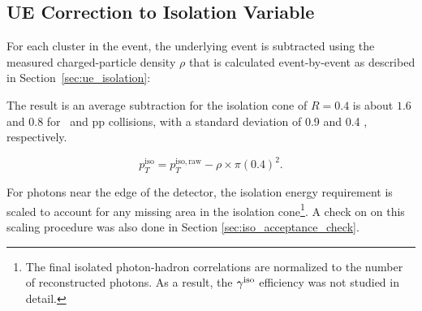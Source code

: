 
\subsection{UE Correction to Isolation Variable}
\label{sec:ue_correction_isolation}
For each cluster in the event, the underlying event is subtracted using the measured charged-particle density $\rho$ that is calculated event-by-event as described in Section~\ref{sec:ue_isolation}:


The result is an average subtraction for the isolation cone of {$R=0.4$} is about {$1.6$ \GeVc} and {$0.8$ \GeVc} for \pPb~and pp collisions, with a standard deviation of {0.9 \GeVc} and {0.4 \GeVc}, respectively.  

\begin{equation}
p_T^\mathrm{iso} = p_T^\mathrm{iso,raw} - \rho\times\pi(0.4)^{2}.
\end{equation}
 
For photons near the edge of the detector, the isolation energy requirement is scaled to account for any missing area in the isolation cone\footnote{The final isolated photon-hadron correlations are normalized to the number of reconstructed photons. As a result, the $\gamma^\mathrm{iso}$ efficiency was not studied in detail.}. A check on on this scaling procedure was also done in Section \ref{sec:iso_acceptance_check}. 

